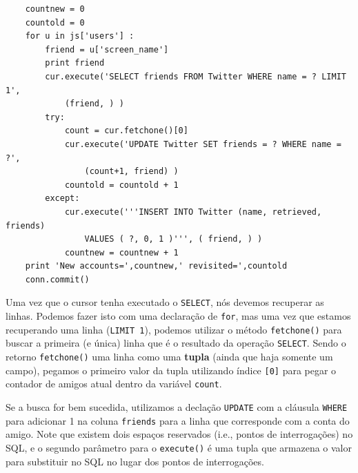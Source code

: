 \beforeverb
\begin{verbatim}
    countnew = 0
    countold = 0
    for u in js['users'] :
        friend = u['screen_name']
        print friend
        cur.execute('SELECT friends FROM Twitter WHERE name = ? LIMIT 1', 
            (friend, ) )
        try:
            count = cur.fetchone()[0]
            cur.execute('UPDATE Twitter SET friends = ? WHERE name = ?', 
                (count+1, friend) )
            countold = countold + 1
        except:
            cur.execute('''INSERT INTO Twitter (name, retrieved, friends) 
                VALUES ( ?, 0, 1 )''', ( friend, ) )
            countnew = countnew + 1
    print 'New accounts=',countnew,' revisited=',countold
    conn.commit()
\end{verbatim}
\afterverb
%

%
Uma vez que o cursor tenha executado o {\tt SELECT}, nós devemos recuperar as
linhas. Podemos fazer isto com uma declaração de {\tt for}, mas uma vez que
estamos recuperando uma linha ({\tt LIMIT 1}), podemos utilizar o método
{\tt fetchone()} para buscar a primeira (e única) linha que é o resultado da
operação {\tt SELECT}. Sendo o retorno {\tt fetchone()} uma linha como uma
{\bf tupla} (ainda que haja somente um campo), pegamos o primeiro valor da
tupla utilizando índice {\tt [0]} para pegar o contador de amigos atual dentro
da variável {\tt count}.


Se a busca for bem sucedida, utilizamos a declação {\tt UPDATE} com a cláusula 
{\tt WHERE} para adicionar 1 na coluna {\tt friends} para a linha que
corresponde com a conta do amigo. Note que existem dois espaços reservados
(i.e., pontos de interrogações) no SQL, e o segundo parâmetro para o
{\tt execute()} é uma tupla que armazena o valor para substituir no SQL no
lugar dos pontos de interrogações.

